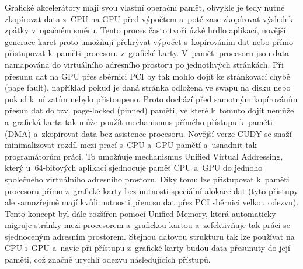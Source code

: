 Grafické akcelerátory mají svou vlastní operační paměť, obvykle je tedy nutné zkopírovat data z~CPU na GPU před výpočtem a~poté zase zkopírovat výsledek zpátky v~opačném směru. Tento proces často tvoří úzké hrdlo aplikací, novější generace karet proto umožňují překrývat výpočet s~kopírováním dat nebo přímo přistupovat k~paměti procesoru z~grafické karty. V~paměti procesoru jsou data namapována do virtuálního adresního prostoru po jednotlivých stránkách. Při přesunu dat na GPU přes sběrnici PCI by tak mohlo dojít ke stránkovací chybě (page fault), například pokud je daná stránka odložena ve swapu na disku nebo pokud k~ní zatím nebylo přistoupeno. Proto dochází před samotným kopírováním přesun dat do tzv. page-locked (pinned) paměti, ve které k~tomuto dojít nemůže a~grafická karta tak může použít mechanismus přímého přístupu k~paměti (DMA) a~zkopírovat data bez asistence procesoru. Novější verze CUDY se snaží minimalizovat rozdíl mezi prací s~CPU a~GPU pamětí a~usnadnit tak programátorům práci. To umožňuje mechanismus Unified Virtual Addressing, který u~64-bitových aplikací sjednocuje paměť CPU a~GPU do jednoho společného virtuálního adresního prostoru. Díky tomu lze přistupovat k~paměti procesoru přímo z~grafické karty bez nutnosti speciální alokace dat (tyto přístupy ale samozřejmě mají kvůli nutnosti přenosu dat přes PCI sběrnici velkou odezvu). Tento koncept byl dále rozšířen pomocí Unified Memory, která automaticky migruje stránky mezi procesorem a~grafickou kartou a~zefektivňuje tak práci se sjednoceným adresním prostorem. Stejnou datovou strukturu tak lze používat na CPU i~GPU a~navíc při přístupu z~grafické karty budou data přesunuty do její paměti, což značně urychlí odezvu následujících přístupů.

